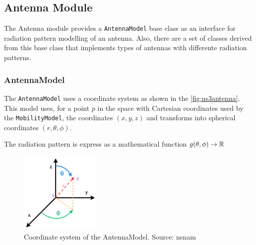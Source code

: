 \subsection{Antenna Module}
The Antenna module provides a \texttt{AntennaModel} base class as an interface for radiation
pattern modelling of an antenna. Also, there are a set of classes derived from this base
class that implements types of antennas with differente radiation patterns.

\subsubsection{AntennaModel}
The \texttt{AntennaModel} uses a coordinate system as shown in the \autoref{fig:ns3antenna}. This
model uses, for a point ${p}$ in the space with Cartesian coordinates used by the \texttt{MobilityModel},
the coordinates ${(x,y,z)}$ and transforms into spherical coordinates ${(r,\theta,\phi)}$.

The radiation pattern is express as a mathematical function ${g(\theta,\phi) \rightarrow \mathbb{R}}$

\begin{figure}[h]
  \centering
  \includegraphics[width=0.35\textwidth]{img/antennamodel.png}
  \caption{Coordinate system of the AntennaModel. Source: nsnam \cite{ns3}}
  \label{fig:ns3antenna}
\end{figure}

